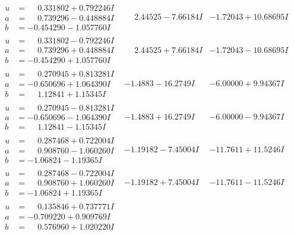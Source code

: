 \documentclass[1p]{elsarticle_modified}
\theoremstyle{definition}
\begin{document}
$$\begin{array}{c|c|c}
\begin{aligned}
u &= \phantom{-}0.331802 + 0.792246 I \\
a &= \phantom{-}0.739296 - 0.448884 I \\
b &= -0.454290 - 1.057760 I\end{aligned}
 & \phantom{-}2.44525 - 7.66184 I & -1.72043 + 10.68695 I \\ \hline\begin{aligned}
u &= \phantom{-}0.331802 - 0.792246 I \\
a &= \phantom{-}0.739296 + 0.448884 I \\
b &= -0.454290 + 1.057760 I\end{aligned}
 & \phantom{-}2.44525 + 7.66184 I & -1.72043 - 10.68695 I \\ \hline\begin{aligned}
u &= \phantom{-}0.270945 + 0.813281 I \\
a &= -0.650696 + 1.064390 I \\
b &= \phantom{-}1.12841 + 1.15345 I\end{aligned}
 & -1.4883 - 16.2749 I & -6.00000 + 9.94367 I \\ \hline\begin{aligned}
u &= \phantom{-}0.270945 - 0.813281 I \\
a &= -0.650696 - 1.064390 I \\
b &= \phantom{-}1.12841 - 1.15345 I\end{aligned}
 & -1.4883 + 16.2749 I & -6.00000 - 9.94367 I \\ \hline\begin{aligned}
u &= \phantom{-}0.287468 + 0.722004 I \\
a &= \phantom{-}0.908760 - 1.060260 I \\
b &= -1.06824 - 1.19365 I\end{aligned}
 & -1.19182 - 7.45004 I & -11.7611 + 11.5246 I \\ \hline\begin{aligned}
u &= \phantom{-}0.287468 - 0.722004 I \\
a &= \phantom{-}0.908760 + 1.060260 I \\
b &= -1.06824 + 1.19365 I\end{aligned}
 & -1.19182 + 7.45004 I & -11.7611 - 11.5246 I \\ \hline\begin{aligned}
u &= \phantom{-}0.135846 + 0.737771 I \\
a &= -0.709220 + 0.909769 I \\
b &= \phantom{-}0.576960 + 1.020220 I\end{aligned}

\end{array}$$
\end{document}
